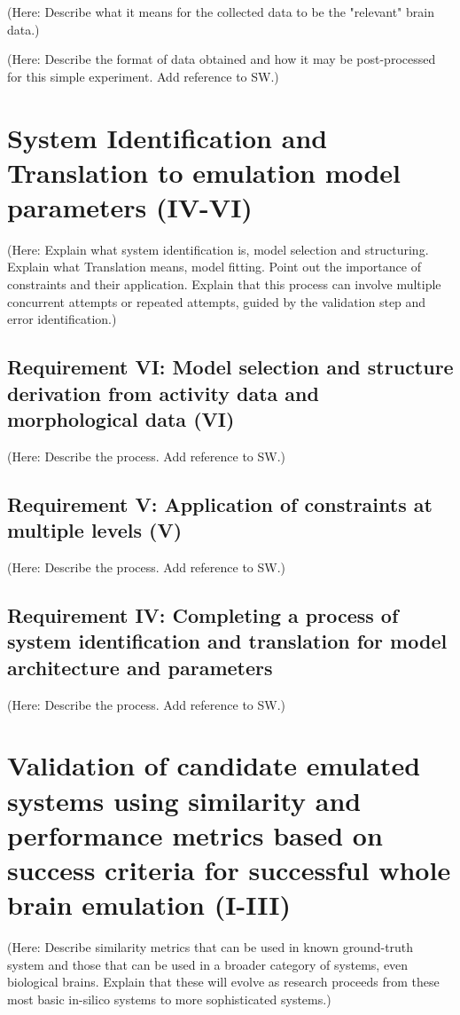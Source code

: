 \documentclass{ldr-article}
\begin{document}
(Here: Describe what it means for the collected data to be the "relevant" brain data.)

(Here: Describe the format of data obtained and how it may be post-processed for this simple experiment. Add reference to SW.)

\section{System Identification and Translation to emulation model parameters (IV-VI)}

(Here: Explain what system identification is, model selection and structuring. Explain what Translation means, model fitting. Point out the importance of constraints and their application. Explain that this process can involve multiple concurrent attempts or repeated attempts, guided by the validation step and error identification.)

\subsection{Requirement VI: Model selection and structure derivation from activity data and morphological data (VI)}

(Here: Describe the process. Add reference to SW.)

\subsection{Requirement V: Application of constraints at multiple levels (V)}

(Here: Describe the process. Add reference to SW.)

\subsection{Requirement IV: Completing a process of system identification and translation for model architecture and parameters}

(Here: Describe the process. Add reference to SW.)

\section{Validation of candidate emulated systems using similarity and performance metrics based on success criteria for successful whole brain emulation (I-III)}

(Here: Describe similarity metrics that can be used in known ground-truth system and those that can be used in a broader category of systems, even biological brains. Explain that these will evolve as research proceeds from these most basic in-silico systems to more sophisticated systems.)
\end{document}

